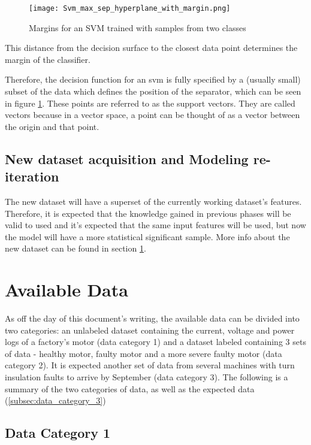 \begin{figure}[htpb]
\centering
\texttt{[image: Svm\_max\_sep\_hyperplane\_with\_margin.png]}
\caption{Margins for an SVM trained with samples from two classes}
\label{fig:svm_margin}
\end{figure}

This distance from the decision surface to the closest data point determines the margin of the classifier.

Therefore, the decision function for an \Acrshort{svm} is fully specified by a (usually small) subset of the data which defines the position of the separator, which can be seen in figure \ref{fig:svm_margin}. These points are referred to as the support vectors. They are called vectors because in a vector space, a point can be thought of as a vector between the origin and that point.

\subsection{New dataset acquisition and Modeling re-iteration}
\label{subsec:reiteration}

The new dataset will have a superset of the currently working dataset's features. Therefore, it is expected that the knowledge gained in previous phases will be valid to used and it's expected that the same input features will be used, but now the model will have a more statistical significant sample. More info about the new dataset can be found in section \ref{sec:available_data}.


\section{Available Data}
\label{sec:available_data}

As off the day of this document's writing, the available data can be divided into two categories: an unlabeled dataset containing the current, voltage and power logs of a factory's motor (data category 1) and a dataset labeled containing 3 sets of data - healthy motor, faulty motor and a more severe faulty motor (data category 2).
It is expected another set of data from several machines with turn insulation faults to arrive by September (data category 3).
The following is a summary of the two categories of data, as well as the expected data (\ref{subsec:data_category_3})

\subsection{Data Category 1}
\label{subsec:data_category_1}

